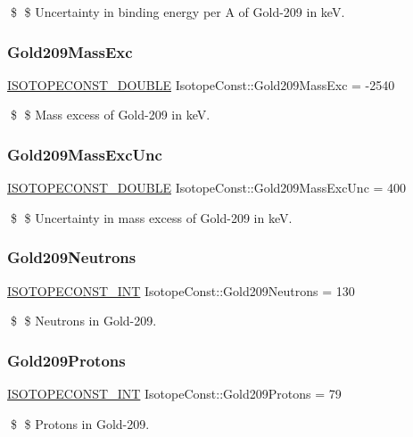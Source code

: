 \$ \$ Uncertainty in binding energy per A of Gold-\/209 in keV. \mbox{\label{group___isotope_const-_gold-_au209_gab4dcfe6e0ab78872da0e11d7d7e1f161}} 
\subsubsection{\texorpdfstring{Gold209\+Mass\+Exc}{Gold209MassExc}}
{\footnotesize\ttfamily \mbox{\hyperlink{group___isotope_const-_macros_ga8f45a7272ce02c0b4c65c44636ed719a}{I\+S\+O\+T\+O\+P\+E\+C\+O\+N\+S\+T\+\_\+\+D\+O\+U\+B\+LE}} Isotope\+Const\+::\+Gold209\+Mass\+Exc = -\/2540}

\$ \$ Mass excess of Gold-\/209 in keV. \mbox{\label{group___isotope_const-_gold-_au209_ga6794093678f1a5a0fdeb49865db5996b}} 
\subsubsection{\texorpdfstring{Gold209\+Mass\+Exc\+Unc}{Gold209MassExcUnc}}
{\footnotesize\ttfamily \mbox{\hyperlink{group___isotope_const-_macros_ga8f45a7272ce02c0b4c65c44636ed719a}{I\+S\+O\+T\+O\+P\+E\+C\+O\+N\+S\+T\+\_\+\+D\+O\+U\+B\+LE}} Isotope\+Const\+::\+Gold209\+Mass\+Exc\+Unc = 400}

\$ \$ Uncertainty in mass excess of Gold-\/209 in keV. \mbox{\label{group___isotope_const-_gold-_au209_ga3d40c46a7154aa88e1af3a24727f8c05}} 
\subsubsection{\texorpdfstring{Gold209\+Neutrons}{Gold209Neutrons}}
{\footnotesize\ttfamily \mbox{\hyperlink{group___isotope_const-_macros_ga5f18360b3e99483a35c32d789e62621c}{I\+S\+O\+T\+O\+P\+E\+C\+O\+N\+S\+T\+\_\+\+I\+NT}} Isotope\+Const\+::\+Gold209\+Neutrons = 130}

\$ \$ Neutrons in Gold-\/209. \mbox{\label{group___isotope_const-_gold-_au209_gabc8723fa03afbb49f99f7e0a15ce5237}} 
\subsubsection{\texorpdfstring{Gold209\+Protons}{Gold209Protons}}
{\footnotesize\ttfamily \mbox{\hyperlink{group___isotope_const-_macros_ga5f18360b3e99483a35c32d789e62621c}{I\+S\+O\+T\+O\+P\+E\+C\+O\+N\+S\+T\+\_\+\+I\+NT}} Isotope\+Const\+::\+Gold209\+Protons = 79}

\$ \$ Protons in Gold-\/209. 